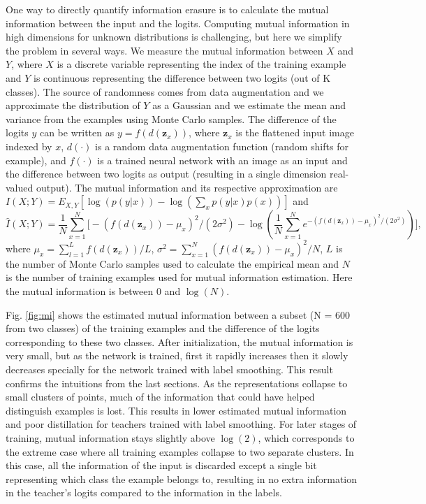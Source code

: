 \documentclass{article}
\begin{document}
One way to directly quantify information erasure is to calculate the mutual information between the input and the logits. Computing mutual information in high dimensions for unknown distributions is challenging, but here we simplify the problem in several ways. We measure the mutual information between $X$ and $Y$, where $X$ is a discrete variable representing the index of the training example and $Y$ is continuous representing the difference between two logits (out of K classes). The source of randomness comes from data augmentation and we approximate the distribution of $Y$ as a Gaussian and we estimate the mean and variance from the examples using Monte Carlo samples. The difference of the logits $y$ can be written as $y = f(d(\bm{z}_x))$, where $\bm{z}_x$ is the flattened input image indexed by $x$, $d(\cdot)$ is a random data augmentation function (random shifts for example), and $f(\cdot)$ is a trained neural network with an image as an input and the difference between two logits as output (resulting in a single dimension real-valued output). The mutual information and its respective approximation are $I(X;Y) = E_{X,Y}[\log(p(y|x)) - \log(\sum_{x}p(y|x)p(x))]$ and 
\[\hat{I}(X;Y) = \frac{1}{N}\sum_{x=1}^{N}\big[-(f(d(\bm{z}_x))-\mu_x)^2/(2\sigma^2) - \log(\frac{1}{N}\sum_{x=1}^{N}e^{-(f(d(\bm{z}_x))-\mu_x)^2/(2\sigma^2)})\big],\]
where $\mu_x = \sum_{l=1}^{L}f(d(\bm{z}_x))/L$, $\sigma^2 = \sum_{x=1}^{N}(f(d(\bm{z}_x)) - \mu_x)^2/N$, $L$ is the number of Monte Carlo samples used to calculate the empirical mean and $N$ is the number of training examples used for mutual information estimation. Here the mutual information is between 0 and $\log(N)$. 

Fig. \ref{fig:mi} shows the estimated mutual information between a subset (N = 600 from two classes) of the training examples and the difference of the logits corresponding to these two classes. After initialization, the mutual information is very small, but as the network is trained, first it rapidly increases then it slowly decreases specially for the network trained with label smoothing. This result confirms the intuitions from the last sections. As the representations collapse to small clusters of points, much of the information that could have helped distinguish examples is lost. This results in lower estimated mutual information and poor distillation for teachers trained with label smoothing. For later stages of training, mutual information stays slightly above $\log(2)$, which corresponds to the extreme case where all training examples collapse to two separate clusters. In this case, all the information of the input is discarded except a single bit representing which class the example belongs to, resulting in no extra information in the teacher's logits compared to the information in the labels. 
\end{document}
